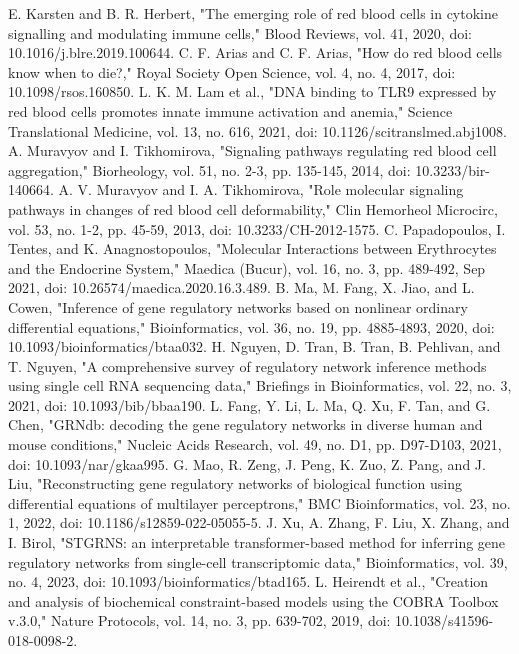 \documentclass[conference]{IEEEtran}
\begin{document}
\begin{thebibliography}{00}
 E. Karsten and B. R. Herbert, "The emerging role of red blood cells in cytokine signalling and modulating immune cells," Blood Reviews, vol. 41, 2020, doi: 10.1016/j.blre.2019.100644.
 C. F. Arias and C. F. Arias, "How do red blood cells know when to die?," Royal Society Open Science, vol. 4, no. 4, 2017, doi: 10.1098/rsos.160850.
 L. K. M. Lam et al., "DNA binding to TLR9 expressed by red blood cells promotes innate immune activation and anemia," Science Translational Medicine, vol. 13, no. 616, 2021, doi: 10.1126/scitranslmed.abj1008.
 A. Muravyov and I. Tikhomirova, "Signaling pathways regulating red blood cell aggregation," Biorheology, vol. 51, no. 2-3, pp. 135-145, 2014, doi: 10.3233/bir-140664.
 A. V. Muravyov and I. A. Tikhomirova, "Role molecular signaling pathways in changes of red blood cell deformability," Clin Hemorheol Microcirc, vol. 53, no. 1-2, pp. 45-59, 2013, doi: 10.3233/CH-2012-1575.
 C. Papadopoulos, I. Tentes, and K. Anagnostopoulos, "Molecular Interactions between Erythrocytes and the Endocrine System," Maedica (Bucur), vol. 16, no. 3, pp. 489-492, Sep 2021, doi: 10.26574/maedica.2020.16.3.489.
 B. Ma, M. Fang, X. Jiao, and L. Cowen, "Inference of gene regulatory networks based on nonlinear ordinary differential equations," Bioinformatics, vol. 36, no. 19, pp. 4885-4893, 2020, doi: 10.1093/bioinformatics/btaa032.
 H. Nguyen, D. Tran, B. Tran, B. Pehlivan, and T. Nguyen, "A comprehensive survey of regulatory network inference methods using single cell RNA sequencing data," Briefings in Bioinformatics, vol. 22, no. 3, 2021, doi: 10.1093/bib/bbaa190.
 L. Fang, Y. Li, L. Ma, Q. Xu, F. Tan, and G. Chen, "GRNdb: decoding the gene regulatory networks in diverse human and mouse conditions," Nucleic Acids Research, vol. 49, no. D1, pp. D97-D103, 2021, doi: 10.1093/nar/gkaa995.
 G. Mao, R. Zeng, J. Peng, K. Zuo, Z. Pang, and J. Liu, "Reconstructing gene regulatory networks of biological function using differential equations of multilayer perceptrons," BMC Bioinformatics, vol. 23, no. 1, 2022, doi: 10.1186/s12859-022-05055-5.
 J. Xu, A. Zhang, F. Liu, X. Zhang, and I. Birol, "STGRNS: an interpretable transformer-based method for inferring gene regulatory networks from single-cell transcriptomic data," Bioinformatics, vol. 39, no. 4, 2023, doi: 10.1093/bioinformatics/btad165.
 L. Heirendt et al., "Creation and analysis of biochemical constraint-based models using the COBRA Toolbox v.3.0," Nature Protocols, vol. 14, no. 3, pp. 639-702, 2019, doi: 10.1038/s41596-018-0098-2.

\end{thebibliography}
\end{document}
